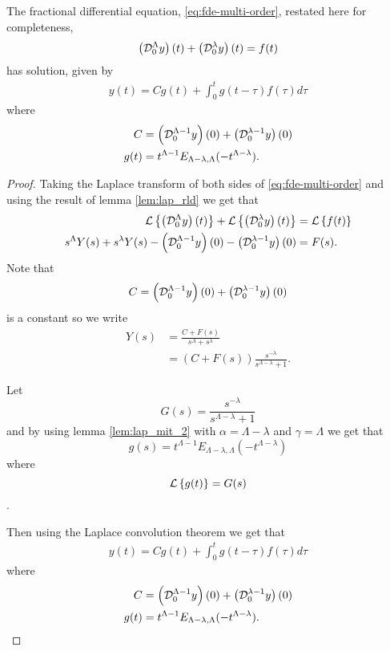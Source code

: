 \documentclass{unswmaths}
\begin{document}
\begin{lemma}
	The fractional differential equation, \ref{eq:fde-multi-order}, restated here for completeness,
	\begin{align*}
		\left( \mathcal{D}_{0}^{\Lambda} y \right)(t) + \left( \mathcal{D}_{0}^{\lambda} y \right)(t) = f(t)
	\end{align*}
	has solution, given by
	\begin{align*}
		y(t) = C g(t) + \int_0^t g(t-\tau)f(\tau) d\tau
	\end{align*}
	where
	\begin{align*}
		C &= \left( \mathcal{D}_{0}^{\Lambda-1} y \right)(0) + \left( \mathcal{D}_{0}^{\lambda-1} y \right)(0) \\
		g(t) &= t^{\Lambda - 1} E_{\Lambda - \lambda, \Lambda}(-t^{\Lambda - \lambda}).
	\end{align*}
\end{lemma}

\begin{proof}

	Taking the Laplace transform of both sides of \ref{eq:fde-multi-order} and using the result of lemma \ref{lem:lap_rld}
	we get that 
	\begin{align*}
		\mathcal{L} \left\{ \left( \mathcal{D}_{0}^{\Lambda} y \right)(t) \right\} + \mathcal{L} \left\{ \left( \mathcal{D}_{0}^{\lambda} y \right)(t) \right\} &= \mathcal{L} \left\{ f(t) \right\} \\
		s^\Lambda Y(s) + s^\lambda Y(s) - \left( \mathcal{D}_{0}^{\Lambda-1} y \right)(0) - \left( \mathcal{D}_{0}^{\lambda-1} y \right)(0) &= F(s).
	\end{align*}
	Note that $$ C = \left( \mathcal{D}_{0}^{\Lambda-1} y \right)(0) + \left( \mathcal{D}_{0}^{\lambda-1} y \right)(0) $$ is a constant so we write
	\begin{align*}
		Y(s) &= \frac{C + F(s)}{s^\Lambda + s^\lambda} \\
			&= \left( C + F(s)\right) \frac{s^{-\lambda}}{s^{\Lambda-\lambda} + 1}.
	\end{align*}
	
	Let $$ G(s) = \frac{s^{-\lambda}}{s^{\Lambda-\lambda} + 1} $$
	and by using lemma \ref{lem:lap_mit_2} with $ \alpha = \Lambda - \lambda $ and $ \gamma = \Lambda $
	we get that $$ g(s) = t^{\Lambda  -1}E_{\Lambda - \lambda, \Lambda}(-t^{\Lambda - \lambda}) $$ where 
	$$ \mathcal{L} \left\{ g(t) \right\} = G(s) $$.
	
	Then using the Laplace convolution theorem we get that 
	\begin{align*}
		y(t) = C g(t) + \int_0^t g(t-\tau)f(\tau) d\tau
	\end{align*}
	where
	\begin{align*}
		C &= \left( \mathcal{D}_{0}^{\Lambda-1} y \right)(0) + \left( \mathcal{D}_{0}^{\lambda-1} y \right)(0) \\
		g(t) &= t^{\Lambda - 1} E_{\Lambda - \lambda, \Lambda}(-t^{\Lambda - \lambda}).
	\end{align*}
\end{proof}
\end{document}
